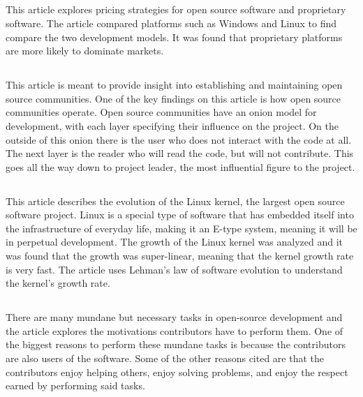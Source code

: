 \documentclass[12pt,letterpaper]{article}
\begin{document}
\subsection*{}
This article explores pricing strategies for open source software and proprietary software. The article compared platforms such as Windows and Linux to find compare the two development models. It was found that proprietary platforms are more likely to dominate markets.

\subsection*{}
This article is meant to provide insight into establishing and maintaining open source communities. One of the key findings on this article is how open source communities operate. Open source communities have an onion model for development, with each layer specifying their influence on the project. On the outside of this onion there is the user who does not interact with the code at all. The next layer is the reader who will read the code, but will not contribute. This goes all the way down to project leader, the most influential figure to the project.

\subsection*{}
This article describes the evolution of the Linux kernel, the largest open source software project. Linux is a special type of software that has embedded itself into the infrastructure of everyday life, making it an E-type system, meaning it will be in perpetual development. The growth of the Linux kernel was analyzed and it was found that the growth was super-linear, meaning that the kernel growth rate is very fast. The article uses Lehman's law of software evolution to understand the kernel's growth rate.

\subsection*{}
There are many mundane but necessary tasks in open-source development and the article explores the motivations contributors have to perform them. One of the biggest reasons to perform these mundane tasks is because the contributors are also users of the software. Some of the other reasons cited are that the contributors enjoy helping others, enjoy solving problems, and enjoy the respect earned by performing said tasks.
\end{document}
